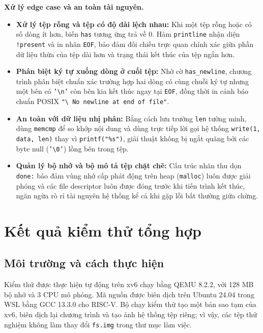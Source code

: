 \documentclass[12pt,a4paper]{article}
\begin{document}
\textbf{Xử lý edge case và an toàn tài nguyên.}
\begin{itemize}
  \item \textbf{Xử lý tệp rỗng và tệp có độ dài lệch nhau:} Khi một tệp rỗng hoặc có số dòng ít hơn, biến \texttt{has} tương ứng trả về $0$. Hàm \texttt{printline} nhận diện \texttt{!present} và in nhãn \texttt{EOF}, bảo đảm đối chiếu trực quan chính xác giữa phần dữ liệu thừa của tệp dài hơn và trạng thái kết thúc của tệp ngắn hơn.
  \item \textbf{Phân biệt ký tự xuống dòng ở cuối tệp:} Nhờ cờ \texttt{has\_newline}, chương trình phân biệt chuẩn xác trường hợp hai dòng có cùng chuỗi ký tự nhưng một bên có \texttt{'\textbackslash n'} còn bên kia kết thúc ngay tại \texttt{EOF}, đồng thời in cảnh báo chuẩn POSIX \texttt{"\textbackslash\ No newline at end of file"}.
  \item \textbf{An toàn với dữ liệu nhị phân:} Bằng cách lưu trường \texttt{len} tường minh, dùng \texttt{memcmp} để so khớp nội dung và dùng trực tiếp lời gọi hệ thống \texttt{write(1, data, len)} thay vì \texttt{printf("\%s")}, giải thuật không bị ngắt quãng bởi các byte null (\texttt{'\textbackslash 0'}) lồng bên trong tệp.
  \item \textbf{Quản lý bộ nhớ và bộ mô tả tệp chặt chẽ:} Cấu trúc nhãn thu dọn \texttt{done:} bảo đảm vùng nhớ cấp phát động trên heap (\texttt{malloc}) luôn được giải phóng và các file descriptor luôn được đóng trước khi tiến trình kết thúc, ngăn ngừa rò rỉ tài nguyên hệ thống kể cả khi gặp lỗi bất thường giữa chừng.
\end{itemize}

\section{Kết quả kiểm thử tổng hợp}

\subsection{Môi trường và cách thực hiện}

Kiểm thử được thực hiện tự động trên xv6 chạy bằng QEMU 8.2.2, với 128 MB bộ nhớ và 3 CPU mô phỏng. Mã nguồn được biên dịch trên Ubuntu 24.04 trong WSL bằng GCC 13.3.0 cho RISC-V. Bộ chạy kiểm thử tạo một bản sao tạm của xv6, biên dịch lại chương trình và tạo ảnh hệ thống tệp riêng; vì vậy, các tệp thử nghiệm không làm thay đổi \texttt{fs.img} trong thư mục làm việc.
\end{document}
